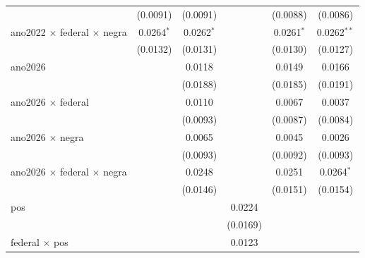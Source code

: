 \begin{tabular}{lccccc}
                                             & (0.0091)              & (0.0091)               &                 & (0.0088)           & (0.0086)\\   
   ano2022 $\times$ federal $\times$ negra   & 0.0264$^{*}$          & 0.0262$^{*}$           &                 & 0.0261$^{*}$       & 0.0262$^{**}$\\   
                                             & (0.0132)              & (0.0131)               &                 & (0.0130)           & (0.0127)\\   
   ano2026                                   &                       & 0.0118                 &                 & 0.0149             & 0.0166\\   
                                             &                       & (0.0188)               &                 & (0.0185)           & (0.0191)\\   
   ano2026 $\times$ federal                  &                       & 0.0110                 &                 & 0.0067             & 0.0037\\   
                                             &                       & (0.0093)               &                 & (0.0087)           & (0.0084)\\   
   ano2026 $\times$ negra                    &                       & 0.0065                 &                 & 0.0045             & 0.0026\\   
                                             &                       & (0.0093)               &                 & (0.0092)           & (0.0093)\\   
   ano2026 $\times$ federal $\times$ negra   &                       & 0.0248                 &                 & 0.0251             & 0.0264$^{*}$\\   
                                             &                       & (0.0146)               &                 & (0.0151)           & (0.0154)\\   
   pos                                       &                       &                        & 0.0224          &                    &   \\   
                                             &                       &                        & (0.0169)        &                    &   \\   
   federal $\times$ pos                      &                       &                        & 0.0123          &                    &   \\   

\end{tabular}
